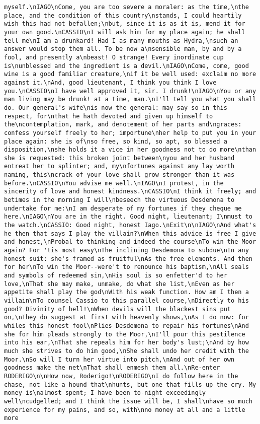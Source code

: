 \begin{verbatim}
myself.\nIAGO\nCome, you are too severe a moraler: as the time,\nthe place, and the condition of this country\nstands, I could heartily wish this had not befallen;\nbut, since it is as it is, mend it for your own good.\nCASSIO\nI will ask him for my place again; he shall tell me\nI am a drunkard! Had I as many mouths as Hydra,\nsuch an answer would stop them all. To be now a\nsensible man, by and by a fool, and presently a\nbeast! O strange! Every inordinate cup is\nunblessed and the ingredient is a devil.\nIAGO\nCome, come, good wine is a good familiar creature,\nif it be well used: exclaim no more against it.\nAnd, good lieutenant, I think you think I love you.\nCASSIO\nI have well approved it, sir. I drunk!\nIAGO\nYou or any man living may be drunk! at a time, man.\nI'll tell you what you shall do. Our general's wife\nis now the general: may say so in this respect, for\nthat he hath devoted and given up himself to the\ncontemplation, mark, and denotement of her parts and\ngraces: confess yourself freely to her; importune\nher help to put you in your place again: she is of\nso free, so kind, so apt, so blessed a disposition,\nshe holds it a vice in her goodness not to do more\nthan she is requested: this broken joint between\nyou and her husband entreat her to splinter; and, my\nfortunes against any lay worth naming, this\ncrack of your love shall grow stronger than it was before.\nCASSIO\nYou advise me well.\nIAGO\nI protest, in the sincerity of love and honest kindness.\nCASSIO\nI think it freely; and betimes in the morning I will\nbeseech the virtuous Desdemona to undertake for me:\nI am desperate of my fortunes if they cheque me here.\nIAGO\nYou are in the right. Good night, lieutenant; I\nmust to the watch.\nCASSIO: Good night, honest Iago.\nExit\n\nIAGO\nAnd what's he then that says I play the villain?\nWhen this advice is free I give and honest,\nProbal to thinking and indeed the course\nTo win the Moor again? For 'tis most easy\nThe inclining Desdemona to subdue\nIn any honest suit: she's framed as fruitful\nAs the free elements. And then for her\nTo win the Moor--were't to renounce his baptism,\nAll seals and symbols of redeemed sin,\nHis soul is so enfetter'd to her love,\nThat she may make, unmake, do what she list,\nEven as her appetite shall play the god\nWith his weak function. How am I then a villain\nTo counsel Cassio to this parallel course,\nDirectly to his good? Divinity of hell!\nWhen devils will the blackest sins put on,\nThey do suggest at first with heavenly shows,\nAs I do now: for whiles this honest fool\nPlies Desdemona to repair his fortunes\nAnd she for him pleads strongly to the Moor,\nI'll pour this pestilence into his ear,\nThat she repeals him for her body's lust;\nAnd by how much she strives to do him good,\nShe shall undo her credit with the Moor.\nSo will I turn her virtue into pitch,\nAnd out of her own goodness make the net\nThat shall enmesh them all.\nRe-enter RODERIGO\n\nHow now, Roderigo!\nRODERIGO\nI do follow here in the chase, not like a hound that\nhunts, but one that fills up the cry. My money is\nalmost spent; I have been to-night exceedingly well\ncudgelled; and I think the issue will be, I shall\nhave so much experience for my pains, and so, with\nno money at all and a little more 
\end{verbatim}
